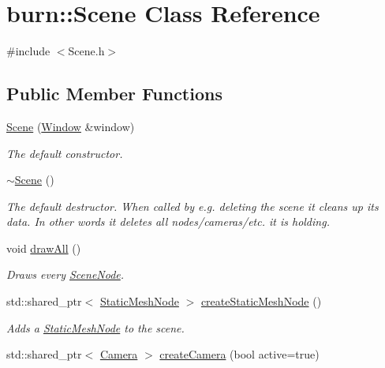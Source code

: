 \hypertarget{classburn_1_1_scene}{\section{burn\-:\-:Scene Class Reference}
\label{classburn_1_1_scene}
}


{\ttfamily \#include $<$Scene.\-h$>$}

\subsection*{Public Member Functions}
\begin{DoxyCompactItemize}
\item 
\hyperlink{classburn_1_1_scene_a9c6d2804f8f0ce73a3eddea66c235ff8}{Scene} (\hyperlink{classburn_1_1_window}{Window} \&window)
\begin{DoxyCompactList}\small\item\em The default constructor. \end{DoxyCompactList}\item 
\hyperlink{classburn_1_1_scene_a7722cda0111bd22ca193174326e66924}{$\sim$\-Scene} ()
\begin{DoxyCompactList}\small\item\em The default destructor. When called by e.\-g. deleting the scene it cleans up its data. In other words it deletes all nodes/cameras/etc. it is holding. \end{DoxyCompactList}\item 
void \hyperlink{classburn_1_1_scene_a5ec4aad558ab7f3299fef632d86da8d3}{draw\-All} ()
\begin{DoxyCompactList}\small\item\em Draws every \hyperlink{classburn_1_1_scene_node}{Scene\-Node}. \end{DoxyCompactList}\item 
std\-::shared\-\_\-ptr$<$ \hyperlink{classburn_1_1_static_mesh_node}{Static\-Mesh\-Node} $>$ \hyperlink{classburn_1_1_scene_af8440772f49bfc6ce5e77a021446ecad}{create\-Static\-Mesh\-Node} ()
\begin{DoxyCompactList}\small\item\em Adds a \hyperlink{classburn_1_1_static_mesh_node}{Static\-Mesh\-Node} to the scene. \end{DoxyCompactList}\item 
std\-::shared\-\_\-ptr$<$ \hyperlink{classburn_1_1_camera}{Camera} $>$ \hyperlink{classburn_1_1_scene_a0cfa518da5d3225c899e26540d7bbba5}{create\-Camera} (bool active=true)

\end{DoxyCompactItemize}
